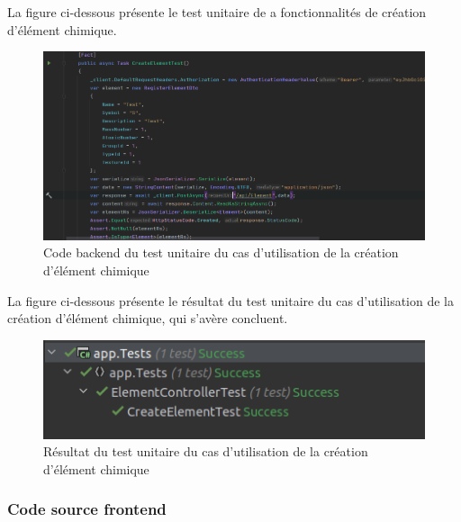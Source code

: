 La figure ci-dessous présente le test unitaire de a fonctionnalités de création d'élément chimique.

\begin{figure}[H]
	\centering
	\includegraphics[width=1\textwidth]{img/cet}
	\caption{Code backend du test unitaire du cas d'utilisation de la création d'élément chimique}
	\label{fig:mesh1}
\end{figure}

La figure ci-dessous présente le résultat du test unitaire du cas d'utilisation de la création d'élément chimique, qui s'avère concluent.

\begin{figure}[H]
	\centering
	\includegraphics[width=1\textwidth]{img/ute}
	\caption{Résultat du test unitaire du cas d'utilisation de la création d'élément chimique}
	\label{fig:mesh1}
\end{figure}

\subsubsection{Code source frontend}

